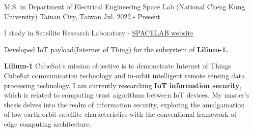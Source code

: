 

\begin{cventries}

  \cventry
    {M.S. in Department of Electrical Engineering}
    {Space Lab (National Cheng Kung University)}
    {Tainan City, Taiwan} %
    {Jul. 2022 - Present} %
    {
      \begin{cvitems} %
      \item {I study in Satellite Research Laboratory - \href{http://satellite.ncku.edu.tw/}{SPACELAB website}}
      \item {Developed IoT payload(Internet of Thing) for the subsystem of \textbf{Lilium-1.}}
      \newline
      \end{cvitems}
    }


\end{cventries}

\begin{cvparagraph}

\textbf{Lilium-1} CubeSat’s mission objective is to demonstrate Internet of Things CubeSat communication technology and in-orbit intelligent remote sensing data processing technology. I am currently researching \textbf{IoT information security}, which is related to computing trust algorithms between IoT devices. My master's thesis delves into the realm of information security, exploring the amalgamation of low-earth orbit satellite characteristics with the conventional framework of edge computing architecture.
\end{cvparagraph}
